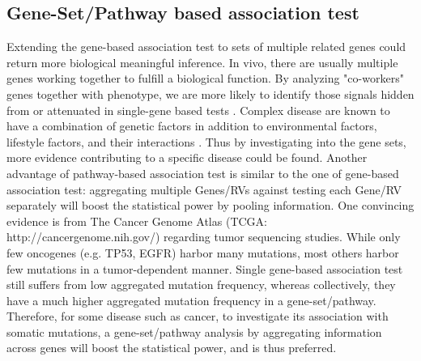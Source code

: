\documentclass[12pt]{article}
\begin{document}
\subsection{Gene-Set/Pathway based association test}\label{sec:bg:Pathway test}
Extending the gene-based association test to sets of multiple related genes could return more biological meaningful inference. In vivo, there are usually multiple genes working together to fulfill a biological function. By analyzing "co-workers" genes together with phenotype, we are more likely to identify those signals hidden from or attenuated in single-gene based tests \cite{BloodPressureGenome-WideAssociationStudies2011,Hirschhorn2009,Zhong2010,Wang2010}. Complex disease are known to have a combination of genetic factors in addition to environmental factors, lifestyle factors, and their interactions \cite{Hirschhorn2005,McCarthy2008}. Thus by investigating into the gene sets, more evidence contributing to a specific disease could be found. Another advantage of pathway-based association test is similar to the one of gene-based association test: aggregating multiple Genes/RVs against testing each Gene/RV separately will boost the statistical power by pooling information. One convincing evidence is from The Cancer Genome Atlas (TCGA: http://cancergenome.nih.gov/) regarding tumor sequencing studies. While only few oncogenes (e.g. TP53, EGFR) harbor many mutations, most others harbor few mutations in a tumor-dependent manner. Single gene-based association test still suffers from low aggregated mutation frequency, whereas collectively, they have a much higher aggregated mutation frequency in a gene-set/pathway. Therefore, for some disease such as cancer, to investigate its association with somatic mutations, a gene-set/pathway analysis by aggregating information across genes will boost the statistical power, and is thus preferred.
\end{document}
